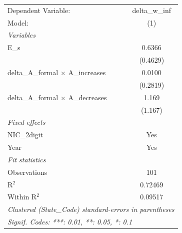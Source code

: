 
\begingroup
\centering
\begin{tabular}{lc}
   \tabularnewline \midrule \midrule
   Dependent Variable:                        & delta\_w\_inf\\    
   Model:                                     & (1)\\  
   \midrule
   \emph{Variables}\\
   E\_s                                       & 0.6366\\   
                                              & (0.4629)\\   
   delta\_A\_formal $\times$ A\_increases     & 0.0100\\   
                                              & (0.2819)\\   
   delta\_A\_formal $\times$ A\_decreases     & 1.169\\   
                                              & (1.167)\\   
   \midrule
   \emph{Fixed-effects}\\
   NIC\_2digit                                & Yes\\  
   Year                                       & Yes\\  
   \midrule
   \emph{Fit statistics}\\
   Observations                               & 101\\  
   R$^2$                                      & 0.72469\\  
   Within R$^2$                               & 0.09517\\  
   \midrule \midrule
   \multicolumn{2}{l}{\emph{Clustered (State\_Code) standard-errors in parentheses}}\\
   \multicolumn{2}{l}{\emph{Signif. Codes: ***: 0.01, **: 0.05, *: 0.1}}\\
\end{tabular}
\par\endgroup


